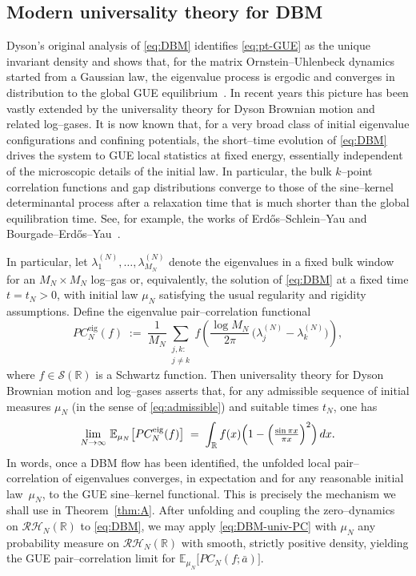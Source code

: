 \documentclass[12pt,reqno]{amsart}
\theoremstyle{plain}
\theoremstyle{definition}
\theoremstyle{remark}
\begin{document}
\subsection{Modern universality theory for DBM} \label{ss:univ}
Dyson’s original analysis of \eqref{eq:DBM} identifies \eqref{eq:pt-GUE} as the unique invariant density and shows that, for the matrix Ornstein–Uhlenbeck dynamics started from a Gaussian law, the eigenvalue process is ergodic and converges in distribution to the global GUE equilibrium~\cite{Dyson}. In recent years this picture has been vastly extended by the universality theory for Dyson Brownian motion and related log–gases. It is now known that, for a very broad class of initial eigenvalue configurations and confining potentials, the short–time evolution of \eqref{eq:DBM} drives the system to GUE local statistics at fixed energy, essentially independent of the microscopic details of the initial law. In particular, the bulk $k$–point correlation functions and gap distributions converge to those of the sine–kernel determinantal process after a relaxation time that is much shorter than the global equilibration time. See, for example, the works of Erd{\H{o}}s–Schlein–Yau and Bourgade–Erd{\H{o}}s–Yau~\cite{AGZ,BourgadeErdosYau2014,DeiftBook,ErdosSchleinYau2011,ErdosYau2012,ForresterBook,LandonSosoeYau2017,PB}.

In particular, let
\(\lambda^{(N)}_1,\dots,\lambda^{(N)}_{M_N}\)
denote the eigenvalues in a fixed bulk window for an $M_N\times M_N$ log–gas or, equivalently, the solution of \eqref{eq:DBM} at a fixed time $t=t_N>0$, with initial law $\mu_N$ satisfying the usual regularity and rigidity assumptions. Define the eigenvalue pair–correlation functional
\begin{equation}
PC_N^{\mathrm{eig}}(f)
 \;:=\;
 \frac{1}{M_N}
 \sum_{\substack{j,k:\\ j\neq k}}
 f\!\left(\frac{\log M_N}{2\pi}\,\bigl(\lambda^{(N)}_j-\lambda^{(N)}_k\bigr)\right),
\end{equation}
where $f\in\mathcal{S}(\mathbb{R})$ is a Schwartz function. Then universality theory for Dyson Brownian motion and log–gases asserts that, for any admissible sequence of initial measures $\mu_N$ (in the sense of \eqref{eq:admissible}) and suitable times $t_N$, one has
\begin{equation}
\label{eq:DBM-univ-PC}
\lim_{N\to\infty}\,
\mathbb{E}_{\mu_N}\bigl[PC_N^{\mathrm{eig}}(f)\bigr]
 \;=\;
\int_{\mathbb{R}} f(x)\Bigl(1-\Bigl(\tfrac{\sin\pi x}{\pi x}\Bigr)^2\Bigr)\,dx.
\end{equation}
In words, once a DBM flow has been identified, the unfolded local pair–correlation of eigenvalues converges, in expectation and for any reasonable initial law~$\mu_N$, to the GUE sine–kernel functional. This is precisely the mechanism we shall use in Theorem~\ref{thm:A}. After unfolding and coupling the zero–dynamics on $\mathcal{RH}_N(\mathbb{R})$ to \eqref{eq:DBM}, we may apply \eqref{eq:DBM-univ-PC} with $\mu_N$ any probability measure on $\mathcal{RH}_N(\mathbb{R})$ with smooth, strictly positive density, yielding the GUE pair–correlation limit for $\mathbb{E}_{\mu_N}\bigl[PC_N(f;\bar a)\bigr]$.
\end{document}
